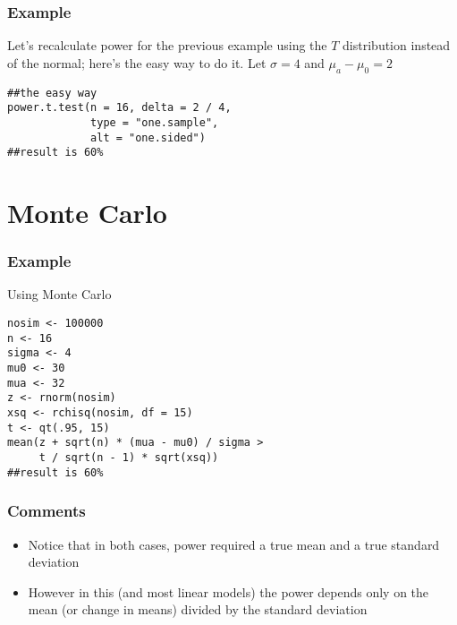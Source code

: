 \documentclass[aspectratio=169]{beamer}
\begin{document}
\begin{frame}[fragile]\frametitle{Example}
Let's recalculate power for the previous example using the $T$ distribution
instead of the normal; here's the easy way to do it. Let $\sigma = 4$
and $\mu_a - \mu_0 = 2$
\begin{verbatim}
##the easy way
power.t.test(n = 16, delta = 2 / 4, 
             type = "one.sample", 
             alt = "one.sided")
##result is 60%
\end{verbatim}
\end{frame}

\section{Monte Carlo}
\begin{frame}[fragile]\frametitle{Example}
Using Monte Carlo
\begin{verbatim}
nosim <- 100000
n <- 16
sigma <- 4
mu0 <- 30
mua <- 32
z <- rnorm(nosim)
xsq <- rchisq(nosim, df = 15)
t <- qt(.95, 15)
mean(z + sqrt(n) * (mua - mu0) / sigma >
     t / sqrt(n - 1) * sqrt(xsq))
##result is 60%
\end{verbatim}
\end{frame}

\begin{frame}\frametitle{Comments}
\begin{itemize}
\item Notice that in both cases, power required a true mean and a true standard deviation
\item However in this (and most linear models) the power depends only on the mean (or change in means) divided by the standard deviation
\end{itemize}
\end{frame}
\end{document}
